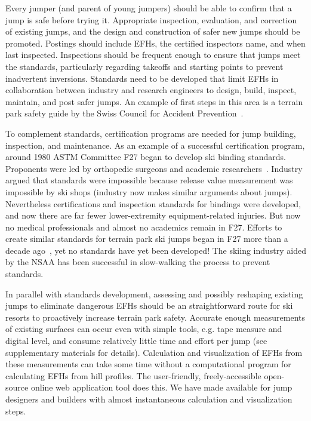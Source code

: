 \documentclass[smallextended]{svjour3}       %
\begin{document}
Every jumper (and parent of young jumpers) should be able to confirm that a jump
is safe before trying it. Appropriate inspection, evaluation, and correction of existing jumps, and the design and construction of safer new jumps should be promoted.  Postings should include EFHs, the certified inspectors name, and when last inspected.  Inspections should be frequent enough to ensure that jumps meet the standards, particularly regarding takeoffs and starting
points to prevent inadvertent inversions. Standards need to be developed that limit EFHs in collaboration between industry and research engineers to design, build, inspect, maintain,
and post safer jumps. An example of first steps in this area is a terrain park safety guide by the Swiss Council for Accident Prevention~\cite{Heer2019}.

To complement standards, certification programs are needed for jump building, inspection, and maintenance. As an example of a successful certification program, around 1980 ASTM Committee
F27 began to develop ski binding standards. Proponents were led by orthopedic
surgeons and academic researchers~\cite{Bahniuk1996}. Industry argued that
standards were impossible because release value measurement was impossible by
ski shops (industry now makes similar arguments about jumps). Nevertheless
certifications and inspection standards for bindings were developed, and now
there are far fewer lower-extremity equipment-related injuries. But now
no medical professionals and almost no academics remain in F27. Efforts to create similar standards for terrain park ski jumps began in F27 more than a decade ago~\cite{SAM2011}, yet no standards have yet been developed! The skiing industry aided by the NSAA has been successful in slow-walking the process to prevent standards.

In parallel with standards development, assessing and possibly reshaping existing jumps
to eliminate dangerous EFHs should be an straightforward route for ski resorts to
proactively increase terrain park safety. Accurate enough measurements of
existing surfaces can occur even with simple tools, e.g. tape measure and digital
level, and consume relatively little time and effort per jump (see supplementary
materials for details). Calculation and visualization of EFHs from these
measurements can take some time without a computational program for calculating
EFHs from hill profiles. The user-friendly, freely-accessible
open-source online web application tool does this. We have made available for jump designers and
builders with almost instantaneous calculation and visualization steps.  
\end{document}
